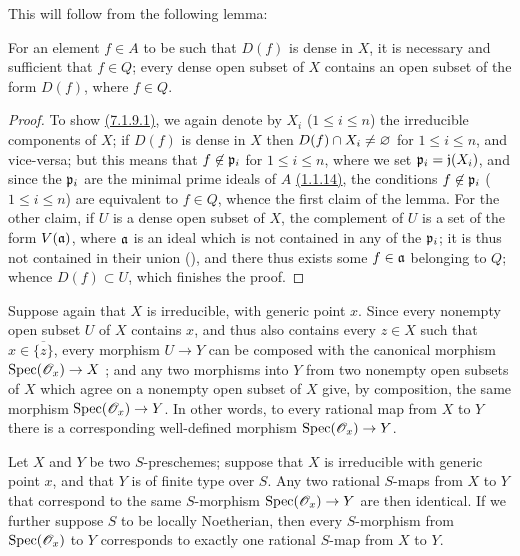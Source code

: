 This will follow from the following lemma:

\begin{lem}[7.1.9.1]
\label{1.7.1.9.1}
For an element $f\in A$ to be such that $D(f)$ is dense in $X$, it is necessary and sufficient that $f\in Q$; every dense open subset of $X$ contains an open subset of the form $D(f)$, where $f\in Q$.
\end{lem}

\begin{proof}
\label{proof-1.7.1.9.1}
To show \hyperref[1.7.1.9.1]{(7.1.9.1)}, we again denote by $X_i$ ($1\leq i\leq n$) the irreducible components of $X$; if $D(f)$ is dense in $X$ then $D(f)\cap X_i\neq\varnothing$ for $1\leq i\leq n$, and vice-versa; but this means that $f\not\in\mathfrak{p}_i$ for $1\leq i\leq n$, where we set $\mathfrak{p}_i=\mathfrak{j}(X_i)$, and since the $\mathfrak{p}_i$ are the minimal prime ideals of $A$ \hyperref[1.1.1.14]{(1.1.14)}, the conditions $f\not\in\mathfrak{p}_i$ ($1\leq i\leq n$) are equivalent to $f\in Q$, whence the first claim of the lemma.
For the other claim, if $U$ is a dense open subset of $X$, the complement of $U$ is a set of the form $V(\mathfrak{a})$, where $\mathfrak{a}$ is an ideal which is not contained in any of the $\mathfrak{p}_i$; it is thus not contained in their union (\cite[p.~13]{I-10}), and there thus exists some $f\in\mathfrak{a}$ belonging to $Q$; whence $D(f)\subset U$, which finishes the proof.
\end{proof}

\begin{env}[7.1.10]
\label{1.7.1.10}
Suppose again that $X$ is irreducible, with generic point $x$.
Since every nonempty open subset $U$ of $X$ contains $x$, and thus also contains every $z\in X$ such that $x\in\overline{\{z\}}$, every morphism $U\to Y$ can be composed with the canonical morphism $\Spec(\OO_x)\to X$ ; and any two morphisms into $Y$ from two nonempty open subsets of $X$ which agree on a nonempty open subset of $X$ give, by composition, the same morphism $\Spec(\OO_x)\to Y$.
In other words, to every rational map from $X$ to $Y$ there is a corresponding well-defined morphism $\Spec(\OO_x)\to Y$.
\end{env}

\begin{prop}[7.1.11]
\label{1.7.1.11}
Let $X$ and $Y$ be two $S$-preschemes; suppose that $X$ is irreducible with generic point $x$, and that $Y$ is of finite type over $S$.
Any two rational $S$-maps from $X$ to $Y$ that correspond to the same $S$-morphism $\Spec(\OO_x)\to Y$ are then identical.
If we further suppose $S$ to be locally Noetherian, then every $S$-morphism from ${\mathop{\mathrm{Spec}}\nolimits}(\mathscr{O}_x)$ to $Y$ corresponds to exactly one rational $S$-map from $X$ to $Y$.
\end{prop}

